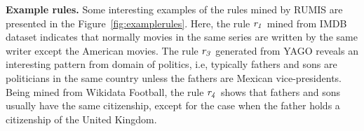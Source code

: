 \textbf{Example rules.} Some interesting examples of the rules mined by RUMIS are presented in the Figure~\ref{fig:examplerules}. Here, the rule $\mathit{r_1}$ mined from IMDB dataset indicates that normally movies in the same series are written by the same writer except the American movies. The rule $\mathit{r_3}$ generated from YAGO reveals an interesting pattern from domain of politics, i.e, typically fathers and sons are politicians in the same country unless the fathers are Mexican vice-presidents. Being mined from Wikidata Football, the rule $\mathit{r_4}$ shows that fathers and sons usually have the same citizenship, except for the case when the father holds a citizenship of the United Kingdom.